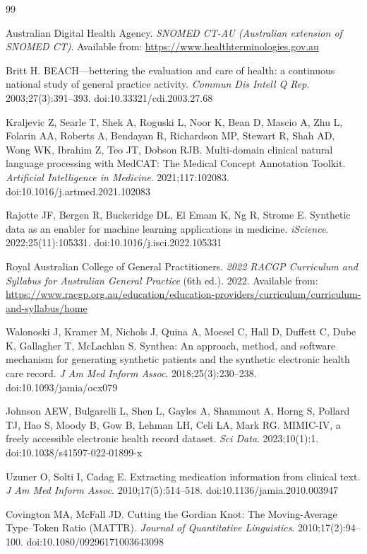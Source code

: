 \documentclass[11pt]{article}
\begin{document}
\begin{thebibliography}{99}

Australian Digital Health Agency. \textit{SNOMED CT-AU (Australian extension of SNOMED CT)}.  
Available from: \url{https://www.healthterminologies.gov.au}

Britt H. BEACH—bettering the evaluation and care of health: a continuous national study of general practice activity.  
\textit{Commun Dis Intell Q Rep}. 2003;27(3):391--393.  
doi:10.33321/cdi.2003.27.68

Kraljevic Z, Searle T, Shek A, Roguski L, Noor K, Bean D, Mascio A, Zhu L, Folarin AA, Roberts A, Bendayan R, Richardson MP, Stewart R, Shah AD, Wong WK, Ibrahim Z, Teo JT, Dobson RJB.
Multi-domain clinical natural language processing with MedCAT: The Medical Concept Annotation Toolkit.
\textit{Artificial Intelligence in Medicine}. 2021;117:102083.
doi:10.1016/j.artmed.2021.102083

Rajotte JF, Bergen R, Buckeridge DL, El Emam K, Ng R, Strome E.
Synthetic data as an enabler for machine learning applications in medicine.
\textit{iScience}. 2022;25(11):105331.
doi:10.1016/j.isci.2022.105331

Royal Australian College of General Practitioners. \textit{2022 RACGP Curriculum and Syllabus for Australian General Practice} (6th ed.). 2022.
Available from: \url{https://www.racgp.org.au/education/education-providers/curriculum/curriculum-and-syllabus/home}

Walonoski J, Kramer M, Nichols J, Quina A, Moesel C, Hall D, Duffett C, Dube K, Gallagher T, McLachlan S.
Synthea: An approach, method, and software mechanism for generating synthetic patients and the synthetic electronic health care record.
\textit{J Am Med Inform Assoc}. 2018;25(3):230--238.
doi:10.1093/jamia/ocx079

Johnson AEW, Bulgarelli L, Shen L, Gayles A, Shammout A, Horng S, Pollard TJ, Hao S, Moody B, Gow B, Lehman LH, Celi LA, Mark RG.
MIMIC-IV, a freely accessible electronic health record dataset.
\textit{Sci Data}. 2023;10(1):1.
doi:10.1038/s41597-022-01899-x

Uzuner O, Solti I, Cadag E.
Extracting medication information from clinical text.
\textit{J Am Med Inform Assoc}. 2010;17(5):514--518.
doi:10.1136/jamia.2010.003947

Covington MA, McFall JD.
Cutting the Gordian Knot: The Moving-Average Type--Token Ratio (MATTR).
\textit{Journal of Quantitative Linguistics}. 2010;17(2):94--100.
doi:10.1080/09296171003643098


\end{thebibliography}
\end{document}
